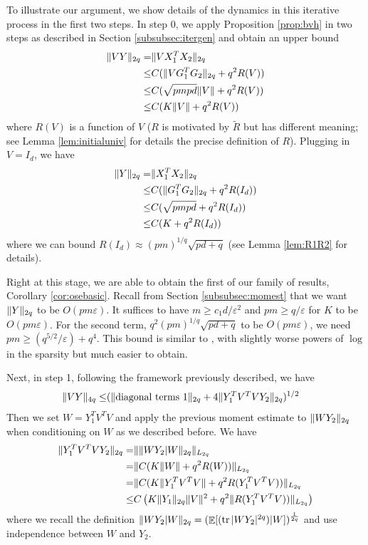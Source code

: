 \documentclass[11pt]{amsart}
\numberwithin{equation}{section}
\numberwithin{equation}{section}
\DeclareMathOperator{\E}{\mathbb{E}}
\DeclareMathOperator*{\tr}{tr}
\DeclarePairedDelimiter{\norm}{\lVert}{\rVert}
\begin{document}
To illustrate our argument, we show details of the dynamics in this iterative process in the first two steps. In step 0, we apply Proposition \ref{prop:bvh} in two steps as described in Section \ref{subsubsec:itergen} and obtain an upper bound
\begin{align*}
    \norm{VY}_{2q}=&\norm{VX_1^TX_2}_{2q}
   \\ \le& C(\norm{VG_1^TG_2}_{2q} + q^{2}R(V))\\\le& C(\sqrt{pmpd}\norm{V} + q^{2}R(V))
   \\\le& C(K\norm{V} + q^{2}R(V))
\end{align*}
where $R(V)$ is a function of $V$ ($R$ is motivated by $\tilde R$ but has different meaning; see Lemma \ref{lem:initialuniv} for details the precise definition of $R$). Plugging in $V=I_d$, we have
\begin{align*}
    \norm{Y}_{2q}=&\norm{X_1^TX_2}_{2q}
   \\ \le& C(\norm{G_1^TG_2}_{2q} + q^{2}R(I_d))\\\le& C(\sqrt{pmpd} + q^{2}R(I_d))
   \\\le& C(K + q^{2}R(I_d))
\end{align*}
where we can bound $R(I_d) \approx (pm)^{1/q}\sqrt{pd+q}$ (see Lemma \ref{lem:R1R2} for details).

Right at this stage, we are able to obtain the first of our family of results, Corollary \ref{cor:osebasic}. Recall from Section \ref{subsubsec:momest} that we want $\norm{Y}_{2q}$ to be $ O(pm\varepsilon)$. It suffices to have $m \ge c_1d/\varepsilon^2$ and $pm \ge q/\varepsilon$ for $K$ to be $O(pm\varepsilon)$. For the second term, $q^2(pm)^{1/q}\sqrt{pd+q}$ to be $O(pm\varepsilon)$, we need $pm \ge (q^{5/2}/\varepsilon)+q^4$. This bound is similar to \cite[Theorem 7]{chenakkod2025optimal}, with slightly worse powers of $\log$ in the sparsity but much easier to obtain. 









Next, in step 1, following the framework previously described, we have
\begin{align*}
\norm{VY}_{4q}
\le & (\norm{\text{diagonal terms 1}}_{2q}+4\norm{Y_1^TV^TVY_2}_{2q})^{1/2}&
\end{align*}
Then we set $W=Y_1^TV^TV$ and apply the previous moment estimate to $\norm{WY_2}_{2q}$ when conditioning on $W$ as we described before. We have
\begin{align*}
\norm{Y_1^TV^TVY_2}_{2q}=&\norm{\norm{WY_2|W}_{2q}}_{L_{2q}}
\\=&\norm{C(K\norm{W} + q^{2}R(W))}_{L_{2q}}
\\=&\norm{C(K\norm{Y_1^TV^TV} + q^{2}R(Y_1^TV^TV))}_{L_{2q}}
\\ \le &C \left( K\norm{Y_1}_{2q}\norm{V}^2+ q^{2}\norm{R(Y_1^TV^TV))}_{L_{2q}}\right)
\end{align*}
where we recall the definition $\norm{WY_2|W}_{2q}=(\E[(\tr|WY_2|^{2q})|W])^{\frac{1}{2q}}$ and use independence between $W$ and $Y_2$.
\end{document}
